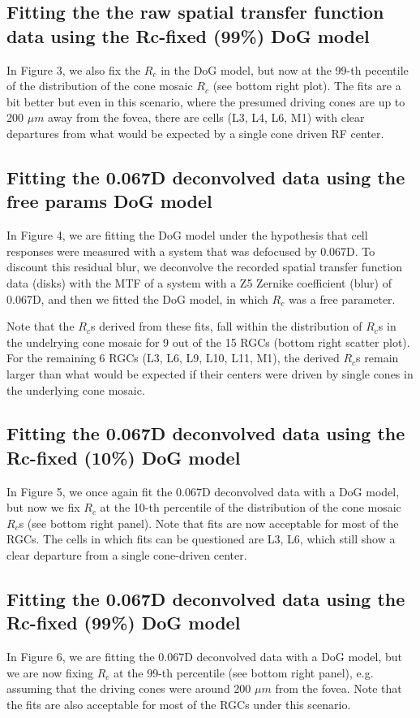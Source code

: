 \documentclass[11pt, oneside]{article}   	%
\begin{document}
\subsection{Fitting the the raw spatial transfer function data using the Rc-fixed (99\%) DoG model}
In Figure 3, we also fix the $R_c$ in the DoG model, but now at the 99-th pecentile of the distribution of the cone mosaic  $R_c$ (see bottom right plot). The fits are a bit better but even in this scenario, where the presumed driving cones are up to 200 $\mu m$ away from the fovea, there are cells (L3, L4, L6, M1) with clear departures from what would be expected by a single cone driven RF center.

\subsection{Fitting the 0.067D deconvolved  data using the free params DoG model} 
In Figure 4, we are fitting the DoG model under the hypothesis that cell responses were measured with a system that was defocused by 0.067D. To discount this residual blur, we deconvolve the recorded spatial transfer function data (disks) with the MTF of a system with a Z5 Zernike coefficient (blur) of 0.067D, and then we fitted the DoG model, in which $R_c$ was a free parameter.

Note that the $R_c$s derived from these fits, fall within the distribution of $R_c$s  in the undelrying cone mosaic for 9 out of the 15 RGCs (bottom right scatter plot). For the remaining 6 RGCs (L3, L6, L9, L10, L11, M1), the derived $R_c$s remain larger than what would be expected if their centers were driven by single cones in the underlying cone mosaic.

\subsection{Fitting the 0.067D deconvolved data using the Rc-fixed (10\%) DoG model}
In Figure 5, we once again fit the 0.067D deconvolved data with a DoG model, but now we fix  $R_c$ at the 10-th percentile of the distribution of the cone mosaic $R_c$s  (see bottom right panel). Note that fits are now acceptable for most of the RGCs. The cells in which fits can be questioned are L3, L6, which still show a clear departure from a single cone-driven center.

\subsection{Fitting the 0.067D deconvolved data using the Rc-fixed (99\%) DoG model} 
In Figure 6, we are fitting the 0.067D deconvolved data with a DoG model, but we are now fixing $R_c$ at the 99-th percentile (see bottom right panel), e.g. assuming that the driving cones were around 200 $\mu m$ from the fovea. Note that the fits are also acceptable for most of the RGCs under this scenario.
\end{document}
